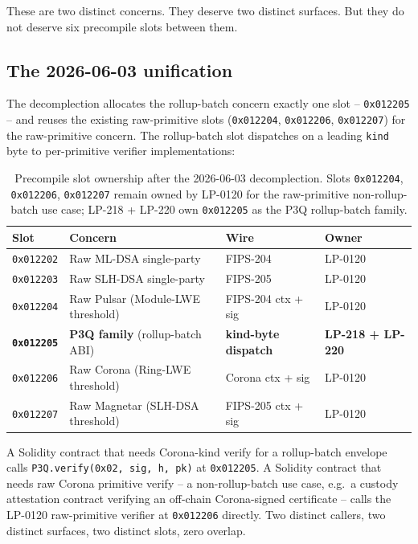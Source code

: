 These are two distinct concerns. They deserve two distinct
surfaces. But they do not deserve six precompile slots between
them.

\subsection{The 2026-06-03 unification}

The decomplection allocates the rollup-batch concern exactly one
slot -- \texttt{0x012205} -- and reuses the existing raw-primitive
slots (\texttt{0x012204}, \texttt{0x012206}, \texttt{0x012207})
for the raw-primitive concern. The rollup-batch slot dispatches
on a leading \texttt{kind} byte to per-primitive verifier
implementations:

\begin{table}[h]
\centering
\small
\begin{tabular}{@{}llll@{}}
\toprule
\textbf{Slot} & \textbf{Concern} & \textbf{Wire} & \textbf{Owner} \\
\midrule
\texttt{0x012202} & Raw ML-DSA single-party & FIPS-204 & LP-0120 \\
\texttt{0x012203} & Raw SLH-DSA single-party & FIPS-205 & LP-0120 \\
\texttt{0x012204} & Raw Pulsar (Module-LWE threshold) & FIPS-204 ctx + sig & LP-0120 \\
\textbf{\texttt{0x012205}} & \textbf{P3Q family} (rollup-batch ABI) & \textbf{kind-byte dispatch} & \textbf{LP-218 + LP-220} \\
\texttt{0x012206} & Raw Corona (Ring-LWE threshold) & Corona ctx + sig & LP-0120 \\
\texttt{0x012207} & Raw Magnetar (SLH-DSA threshold) & FIPS-205 ctx + sig & LP-0120 \\
\bottomrule
\end{tabular}
\caption{Precompile slot ownership after the 2026-06-03
decomplection. Slots \texttt{0x012204}, \texttt{0x012206},
\texttt{0x012207} remain owned by LP-0120 for the raw-primitive
non-rollup-batch use case; LP-218 + LP-220 own \texttt{0x012205}
as the P3Q rollup-batch family.}
\label{tab:slot-ownership}
\end{table}

A Solidity contract that needs Corona-kind verify for a
rollup-batch envelope calls
\texttt{P3Q.verify(0x02, sig, h, pk)} at \texttt{0x012205}. A
Solidity contract that needs raw Corona primitive verify -- a
non-rollup-batch use case, e.g.\ a custody attestation contract
verifying an off-chain Corona-signed certificate -- calls the
LP-0120 raw-primitive verifier at \texttt{0x012206} directly. Two
distinct callers, two distinct surfaces, two distinct slots,
zero overlap.

